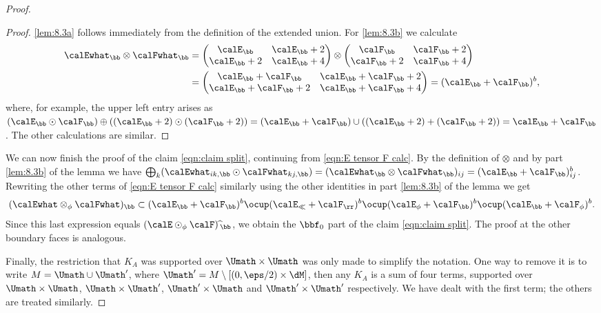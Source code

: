 \begin{proof}
\begin{proof}
\eqref{lem:8.3a} follows immediately from the definition of the extended union. For \eqref{lem:8.3b} we calculate
\begin{align*}
\calEwhat_\bb\otimes \calFwhat_\bb
&=
\begin{pmatrix}
\calE_\bb & \calE_\bb+2 \\
\calE_\bb+2 & \calE_\bb+4
\end{pmatrix}
\otimes
\begin{pmatrix}
\calF_\bb & \calF_\bb+2 \\
\calF_\bb+2 & \calF_\bb+4
\end{pmatrix}
\\ &=
\begin{pmatrix}
\calE_\bb+\calF_\bb & \calE_\bb+\calF_\bb+2 \\
\calE_\bb+\calF_\bb+2 & \calE_\bb+\calF_\bb+4
\end{pmatrix}
= (\calE_\bb+\calF_\bb)^b,
\end{align*}
where, for example, the upper left entry arises as
$(\calE_\bb \odot \calF_\bb) \oplus
((\calE_\bb+2) \odot (\calF_\bb+2))
=
(\calE_\bb + \calF_\bb) \cup
((\calE_\bb+2) + (\calF_\bb+2))
= \calE_\bb + \calF_\bb$.
The other calculations are similar.
\end{proof}
We can now finish the proof of the claim \eqref{eqn:claim split}, continuing from \eqref{eqn:E tensor F calc}. By the definition of $\otimes$ and by part \eqref{lem:8.3b} of the lemma we have
$ \bigoplus_k (\calEwhat_{ik,\bb} \odot \calFwhat_{kj,\bb}) = (\calEwhat_\bb\otimes\nobreak\calFwhat_\bb)_{ij} = (\calE_\bb+\calF_\bb)^b_{ij}$.
Rewriting the other terms of \eqref{eqn:E tensor F calc} similarly using the other identities in part \eqref{lem:8.3b} of the lemma we get\vspace*{-3pt}
\[
(\calEwhat \otimes_\phi \calFwhat)_\bb \subset
(\calE_\bb+\calF_\bb)^b \ocup (\calE_\ll+\calF_\rr)^b \ocup (\calE_\phi+\calF_\bb)^b \ocup (\calE_\bb+\calF_\phi)^b.
\]
Since this last expression equals $(\calE\odot_\phi \calF)\,\widehat{}_\bb$,
we obtain the $\bbf_0$ part of the claim \eqref{eqn:claim split}.
The proof at the other boundary faces is analogous.

Finally, the restriction that $K_A$ was supported over $\Umath\times\Umath$ was only made to simplify the notation. One way to remove it is to write $M=\Umath\cup\Umath'$, where \hbox{$\Umath'=M\setminus[(0,\eps/2)\times\dM]$}, then any $K_A$ is a sum of four terms, supported over $\Umath\times\Umath$, $\Umath\times\Umath'$, $\Umath'\times\Umath$
and $\Umath'\times\Umath'$ respectively. We have dealt with the first term; the others are treated similarly.
\end{proof}

